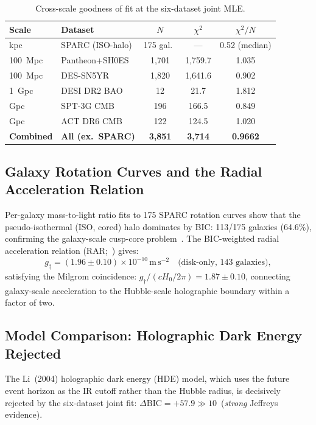 \documentclass[12pt,a4paper]{article}
\begin{document}
\begin{table}[t]
\centering
\caption{Cross-scale goodness of fit at the six-dataset joint MLE.}
\label{tab:crossscale}
\begin{tabular}{@{}llccc@{}}
\toprule
Scale & Dataset & $N$ & $\chi^2$ & $\chi^2/N$ \\
\midrule
kpc & SPARC (ISO-halo) & 175 gal.\ & --- & 0.52 (median) \\
100~Mpc & Pantheon+SH0ES & 1,701 & 1,759.7 & 1.035 \\
100~Mpc & DES-SN5YR & 1,820 & 1,641.6 & 0.902 \\
1~Gpc & DESI DR2 BAO & 12 & 21.7 & 1.812 \\
Gpc & SPT-3G CMB & 196 & 166.5 & 0.849 \\
Gpc & ACT DR6 CMB & 122 & 124.5 & 1.020 \\
\midrule
\textbf{Combined} & \textbf{All (ex.\ SPARC)} & \textbf{3,851} & \textbf{3,714} & \textbf{0.9662} \\
\bottomrule
\end{tabular}
\end{table}

\subsection{Galaxy Rotation Curves and the Radial Acceleration Relation}

Per-galaxy mass-to-light ratio fits to 175 SPARC rotation curves show that
the pseudo-isothermal (ISO, cored) halo dominates by BIC: 113/175 galaxies
(64.6\%), confirming the galaxy-scale cusp-core problem~\cite{deBlok2010}.
The BIC-weighted radial acceleration relation (RAR;~\cite{McGaugh2016}) gives:
\begin{equation}
g_\dagger = (1.96 \pm 0.10)\times 10^{-10}\,\mathrm{m\,s^{-2}}
\quad\text{(disk-only, 143 galaxies)},
\label{eq:gdagger}
\end{equation}
satisfying the Milgrom coincidence: $g_\dagger/(cH_0/2\pi) = 1.87 \pm 0.10$,
connecting galaxy-scale acceleration to the Hubble-scale holographic
boundary within a factor of two.

\subsection{Model Comparison: Holographic Dark Energy Rejected}

The Li~(2004) holographic dark energy (HDE) model, which uses the future
event horizon as the IR cutoff rather than the Hubble radius, is decisively
rejected by the six-dataset joint fit:
$\Delta\mathrm{BIC} = +57.9 \gg 10$~(\textit{strong} Jeffreys evidence).
\end{document}
